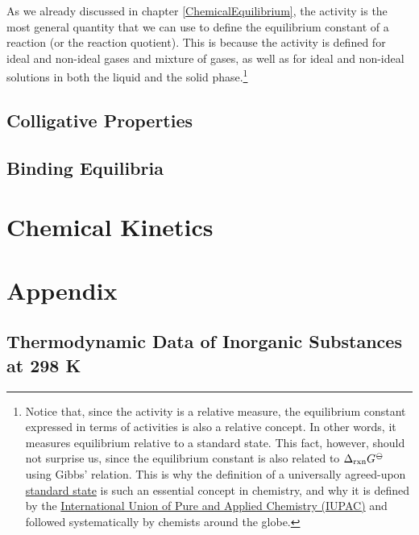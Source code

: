 \documentclass[
  9pt,
]{extbook}
\theoremstyle{definition}
\theoremstyle{definition}
\theoremstyle{definition}
\theoremstyle{remark}
\begin{document}
As we already discussed in chapter \ref{ChemicalEquilibrium}, the activity is the most general quantity that we can use to define the equilibrium constant of a reaction (or the reaction quotient). This is because the activity is defined for ideal and non-ideal gases and mixture of gases, as well as for ideal and non-ideal solutions in both the liquid and the solid phase.\footnote{Notice that, since the activity is a relative measure, the equilibrium constant expressed in terms of activities is also a relative concept. In other words, it measures equilibrium relative to a standard state. This fact, however, should not surprise us, since the equilibrium constant is also related to \(\Delta_{\text{rxn}} G^{{-\kern-6pt{\ominus}\kern-6pt-}}\) using Gibbs' relation. This is why the definition of a universally agreed-upon \href{https://en.wikipedia.org/wiki/Standard_state}{standard state} is such an essential concept in chemistry, and why it is defined by the \href{https://en.wikipedia.org/wiki/International_Union_of_Pure_and_Applied_Chemistry}{International Union of Pure and Applied Chemistry (IUPAC)} and followed systematically by chemists around the globe.}

\hypertarget{colligative-properties}{%
\section{Colligative Properties}\label{colligative-properties}}

\hypertarget{binding-equilibria}{%
\section{Binding Equilibria}\label{binding-equilibria}}

\hypertarget{Kinetics}{%
\chapter{Chemical Kinetics}\label{Kinetics}}

\renewcommand*{\standardstate}{{-\kern-6pt{\ominus}\kern-6pt-}}

\hypertarget{appendix}{%
\chapter{Appendix}\label{appendix}}

\hypertarget{thermodynamic-data-of-inorganic-substances-at-298-k}{%
\section{Thermodynamic Data of Inorganic Substances at 298 K}\label{thermodynamic-data-of-inorganic-substances-at-298-k}}
\end{document}

